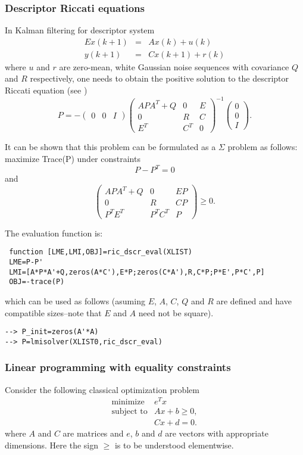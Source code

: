 \subsubsection{Descriptor Riccati equations}
In Kalman filtering for descriptor system
\begin{eqnarray*}
Ex(k+1)& = & Ax(k) + u(k) \\
y(k+1)&=& Cx(k+1) + r(k)
\end{eqnarray*}
where $u$ and $r$ are zero-mean, white Gaussian noise sequences with 
covariance $Q$ and $R$ respectively, one needs to obtain the positive
solution to the descriptor Riccati equation (see \cite{ramine})
\[
P=-\left( \begin{array}{ccc} 0 & 0 & I \end{array} \right)
\left( \begin{array}{ccc} APA^T + Q & 0 & E \\
                           0   & R & C \\
                            E^T  & C^T & 0 \end{array} \right)^{-1}
\left( \begin{array}{c} 0 \\ 0 \\ I \end{array} \right) .
\]

It can be shown that this problem can be formulated as a $\Sigma$
problem as follows: maximize Trace(P) under constraints
\[
P-P^T=0
\]
and 
\[
\left( \begin{array}{ccc} APA^T + Q & 0 & EP \\
                           0   & R & CP \\
                          P^TE^T  & P^TC^T & P \end{array} \right)
\geq 0 .
\]

The evaluation function is:
\begin{verbatim}
 function [LME,LMI,OBJ]=ric_dscr_eval(XLIST)
 LME=P-P'
 LMI=[A*P*A'+Q,zeros(A*C'),E*P;zeros(C*A'),R,C*P;P*E',P*C',P]
 OBJ=-trace(P)
\end{verbatim}
which can be used as follows (asuming $E$, $A$, $C$, $Q$ and $R$ are
defined and have compatible sizes--note that $E$ and $A$ need not be
square).
\begin{verbatim}
--> P_init=zeros(A'*A)
--> P=lmisolver(XLIST0,ric_dscr_eval)
\end{verbatim}

\subsubsection{Linear programming with equality constraints}
\label{ex4}
Consider the following classical optimization problem
\[
\begin{array}{cc}
\mbox{minimize} & e^Tx \\
\mbox{subject to} & Ax + b \geq 0, \\
& Cx+d = 0.
\end{array}
\]
where $A$ and $C$ are matrices and $e$, $b$ and $d$ are vectors with
appropriate dimensions. Here the sign $\geq$ is to be understood elementwise.

